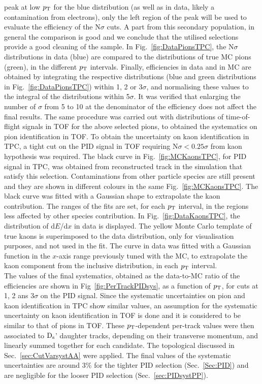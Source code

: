 peak at low $p_{\rm T}$ for
the blue distribution (as well as in data, likely a contamination from electrons), 
only the left region of the peak will be used 
to evaluate the efficiency of the N$\sigma$ cuts.
A part from this secondary population, in general the comparison is good and we
conclude that the utilised selections provide a good
cleaning of the sample. 
In Fig.~\ref{fig:DataPionsTPC}, the N$\sigma$ distributions in data (blue) are compared
to the distributions of true MC pions (green), in the different $p_{\rm T}$ intervals.  
Finally, efficiencies in data and in MC are obtained by integrating the respective 
distributions (blue and green distributions in Fig.~\ref{fig:DataPionsTPC})
within 1, 2 or 3$\sigma$, and normalising these values to the integral 
of the distributions within 5$\sigma$. It was verified that enlarging the number of $\sigma$ from 5 to 10 at the 
denominator of the efficiency does not affect the final results.
The same procedure
was carried out with distributions of time-of-flight signals in TOF
for the above selected pions, to obtained the systematics on pion identification in TOF.
To obtain the uncertainty on kaon identification in TPC, a tight cut on the PID 
signal in TOF requiring N$\sigma < 0.25\sigma$ from kaon hypothesis was required. 
The black curve in Fig.~\ref{fig:MCKaonsTPC}, for PID signal in TPC, was obtained
from reconstructed track in the simulation that satisfy this selection.
Contaminations from other particle species are still present and they
are shown in different colours in the same Fig.~\ref{fig:MCKaonsTPC}. 
The black curve was fitted with a Gaussian shape 
to extrapolate the kaon contribution. The ranges of the fits are set, for each $p_{\rm T}$ interval, in 
the regions less affected by other species contribution.
In Fig.~\ref{fig:DataKaonsTPC}, the distribution of d$E$/d$x$ in data is displayed. 
The yellow Monte Carlo template of true 
kaons is superimposed to the data distribution, 
only for visualisation purposes, and not used in the fit. The curve in data
was fitted with a Gaussian function in the $x$-axis range previously tuned with the MC,
to extrapolate the kaon component from the inclusive distribution, in each $p_{\rm T}$ interval.\\
The values of the final systematics, obtained as the data-to-MC ratio
of the efficiencies are shown in Fig~\ref{fig:PerTrackPIDsys}, as a function of $p_{\rm T}$,
for cuts at 1, 2 ans 3$\sigma$ on the PID signal. 
Since the systematic uncertainties on pion and kaon identification in 
TPC show similar values, an assumption for the systematic uncertainty 
on kaon identification in TOF is done and it is considered to be similar to that of pions in TOF.
These $p_{\rm T}$-dependent per-track values were then associated to
${\rm D_s}$' daughter tracks, depending on their transverse momentum, and linearly summed together 
for each candidate. The topological discussed 
in Sec.~\ref{sec:CutVarsystAA} were applied. 
The final values of the systematic uncertainties are around 
3\% for the tighter PID selection (Sec.~\ref{Sec:PID}) and are negligible for the
looser PID selection (Sec.~\ref{sec:PIDsystPP}).

